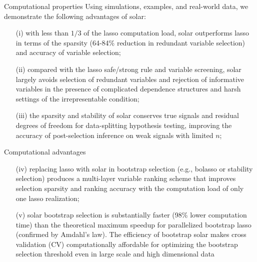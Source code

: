 \documentclass{beamer}
\begin{document}
\begin{frame}{Computational properties}
  Using simulations, examples, and real-world data, we demonstrate the following advantages of solar:
  \begin{itemize}  
    \item  [(i)] with less than $1/3$ of the lasso computation load, solar outperforms lasso in terms of the sparsity (64-84\% reduction in redundant variable selection) and accuracy of variable selection;
    
    \item  [(ii)] compared with the lasso safe/strong rule and variable screening, solar largely avoids selection of redundant variables and rejection of informative variables in the presence of complicated dependence structures and harsh settings of the irrepresentable condition;
    
    \item  [(iii)] the sparsity and stability of solar conserves true signals and residual degrees of freedom for data-splitting hypothesis testing, improving the accuracy of post-selection inference on weak signals with limited $n$;  
  \end{itemize}
\end{frame}

\begin{frame}{Computational advantages}
  \begin{itemize}  
    \item  [(iv)] replacing lasso with solar in bootstrap selection (e.g., bolasso or stability selection) produces a multi-layer variable ranking scheme that improves selection sparsity and ranking accuracy with the computation load of only one lasso realization; 
    
    \item  [(v)]  solar bootstrap selection is substantially faster (98\% lower computation time) than the theoretical maximum speedup for parallelized bootstrap lasso (confirmed by Amdahl's law). The efficiency of bootstrap solar makes cross validation (CV) computationally affordable for optimizing the bootstrap selection threshold even in large scale and high dimensional data
  \end{itemize}
\end{frame}

\begin{frame}[allowframebreaks]
  
  
\end{frame}
\end{document}
